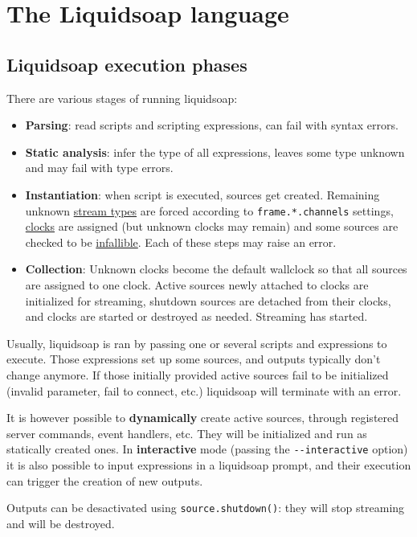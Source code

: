 \chapter{The Liquidsoap language}
\section{Liquidsoap execution phases}
There are various stages of running liquidsoap:

\begin{itemize}
\item \textbf{Parsing}: read scripts and scripting expressions, can fail with syntax errors.
\item \textbf{Static analysis}: infer the type of all expressions, leaves some type unknown and may fail with type errors.
\item \textbf{Instantiation}: when script is executed, sources get created. Remaining unknown \href{stream_contents.html}{stream types} are forced according to \verb+frame.*.channels+ settings, \href{clock.html}{clocks} are assigned (but unknown clocks may remain) and some sources are checked to be \href{source.htmls}{infallible}. Each of these steps may raise an error.
\item \textbf{Collection}: Unknown clocks become the default wallclock so that all sources are assigned to one clock. Active sources newly attached to clocks are initialized for streaming, shutdown sources are detached from their clocks, and clocks are started or destroyed as needed. Streaming has started.

\end{itemize}
Usually, liquidsoap is ran by passing one or several scripts and expressions to execute. Those expressions set up some sources, and outputs typically don't change anymore. If those initially provided active sources fail to be initialized (invalid parameter, fail to connect, etc.) liquidsoap will terminate with an error.

It is however possible to \textbf{dynamically} create active sources,
through registered server commands, event handlers, etc.
They will be initialized and run as statically created ones.
In \textbf{interactive} mode (passing the \verb+--interactive+ option)
it is also possible to input expressions in a liquidsoap prompt,
and their execution can trigger the creation of new outputs.

Outputs can be desactivated using \verb+source.shutdown()+:
they will stop streaming and will be destroyed.

